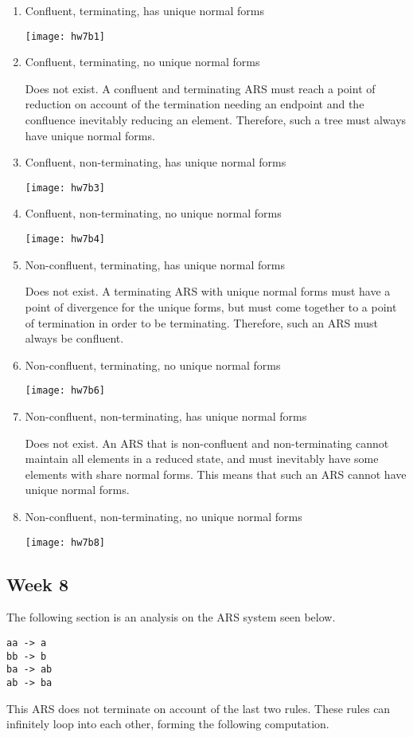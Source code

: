 \documentclass{article}
\theoremstyle{theorem}
\theoremstyle{definition}
\theoremstyle{remark}
\begin{document}
\begin{enumerate}
\item {Confluent, terminating, has unique normal forms

\texttt{[image: hw7b1]}}
\item {Confluent, terminating, no unique normal forms

Does not exist. A confluent and terminating ARS must reach a point of reduction on account of the termination needing an endpoint and the confluence inevitably reducing an element. Therefore, such a tree must always have unique normal forms.}
\item {Confluent, non-terminating, has unique normal forms

\texttt{[image: hw7b3]}}
\item {Confluent, non-terminating, no unique normal forms

\texttt{[image: hw7b4]}}
\item {Non-confluent, terminating, has unique normal forms

Does not exist. A terminating ARS with unique normal forms must have a point of divergence for the unique forms, but must come together to a point of termination in order to be terminating. Therefore, such an ARS must always be confluent.}
\item {Non-confluent, terminating, no unique normal forms

\texttt{[image: hw7b6]}}
\item {Non-confluent, non-terminating, has unique normal forms

Does not exist. An ARS that is non-confluent and non-terminating cannot maintain all elements in a reduced state, and must inevitably have some elements with share normal forms. This means that such an ARS cannot have unique normal forms.}
\item {Non-confluent, non-terminating, no unique normal forms

\texttt{[image: hw7b8]}}
\end{enumerate}

\subsection{Week 8}
The following section is an analysis on the ARS system seen below.

\begin{lstlisting}
aa -> a
bb -> b
ba -> ab
ab -> ba
\end{lstlisting}
%
This ARS does not terminate on account of the last two rules. These rules can infinitely loop into each other, forming the following computation.
\end{document}
